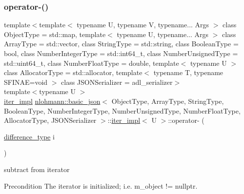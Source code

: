\subsubsection{\texorpdfstring{operator-\/()}{operator-()}\hspace{0.1cm}{\footnotesize\ttfamily [1/2]}}
{\footnotesize\ttfamily template$<$template$<$ typename U, typename V, typename... Args $>$ class Object\+Type = std\+::map, template$<$ typename U, typename... Args $>$ class Array\+Type = std\+::vector, class String\+Type  = std\+::string, class Boolean\+Type  = bool, class Number\+Integer\+Type  = std\+::int64\+\_\+t, class Number\+Unsigned\+Type  = std\+::uint64\+\_\+t, class Number\+Float\+Type  = double, template$<$ typename U $>$ class Allocator\+Type = std\+::allocator, template$<$ typename T, typename S\+F\+I\+N\+A\+E=void $>$ class J\+S\+O\+N\+Serializer = adl\+\_\+serializer$>$ \\
template$<$typename U $>$ \\
\hyperlink{classnlohmann_1_1basic__json_1_1iter__impl}{iter\+\_\+impl} \hyperlink{classnlohmann_1_1basic__json}{nlohmann\+::basic\+\_\+json}$<$ Object\+Type, Array\+Type, String\+Type, Boolean\+Type, Number\+Integer\+Type, Number\+Unsigned\+Type, Number\+Float\+Type, Allocator\+Type, J\+S\+O\+N\+Serializer $>$\+::\hyperlink{classnlohmann_1_1basic__json_1_1iter__impl}{iter\+\_\+impl}$<$ U $>$\+::operator-\/ (\begin{DoxyParamCaption}\item[{\hyperlink{classnlohmann_1_1basic__json_1_1iter__impl_aa3d908ee643e5938d32e5f6d261d7715}{difference\+\_\+type}}]{i }\end{DoxyParamCaption})\hspace{0.3cm}{\ttfamily [inline]}}



subtract from iterator 

\begin{DoxyPrecond}{Precondition}
The iterator is initialized; i.\+e. {\ttfamily m\+\_\+object != nullptr}. 
\end{DoxyPrecond}
\mbox{\label{classnlohmann_1_1basic__json_1_1iter__impl_a3bedce4ada748251e86c7924be54e210}} 
